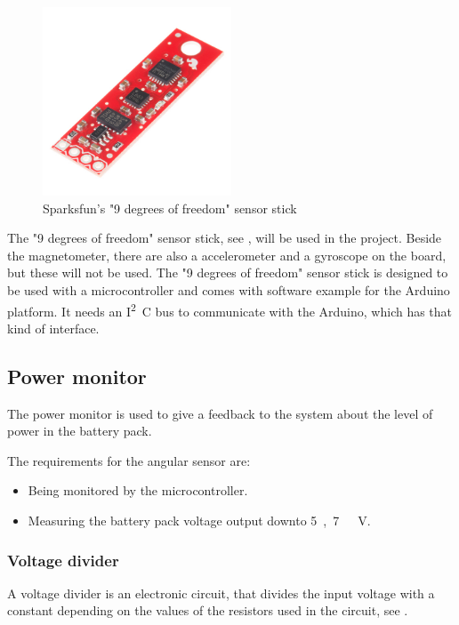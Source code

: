 \begin{figure}[H]
	\centering
	\includegraphics[width=0.50\textwidth]{figures/NineDegree.jpg}
		\caption{Sparksfun's "9 degrees of freedom" sensor stick} 
	\label{NineDegree}
\end{figure}

The "9 degrees of freedom" sensor stick, see , will be used in the project. Beside the magnetometer, there are also a accelerometer and a gyroscope on the board, but these will not be used. The "9 degrees of freedom" sensor stick is designed to be used with a microcontroller and comes with software example for the Arduino platform. It needs an  \si{I^2C} bus to communicate with the Arduino, which has that kind of interface.


\subsection{Power monitor}
The power monitor is used to give a feedback to the system about the level of power in the battery pack.

The requirements for the angular sensor are:
\begin{itemize}
\item Being monitored by the microcontroller.
\item Measuring the battery pack voltage output downto \si{5,7\ V}.
\end{itemize}

\subsubsection{Voltage divider}
A voltage divider is an electronic circuit, that divides the input voltage with a constant depending on the values of the resistors used in the circuit, see .

